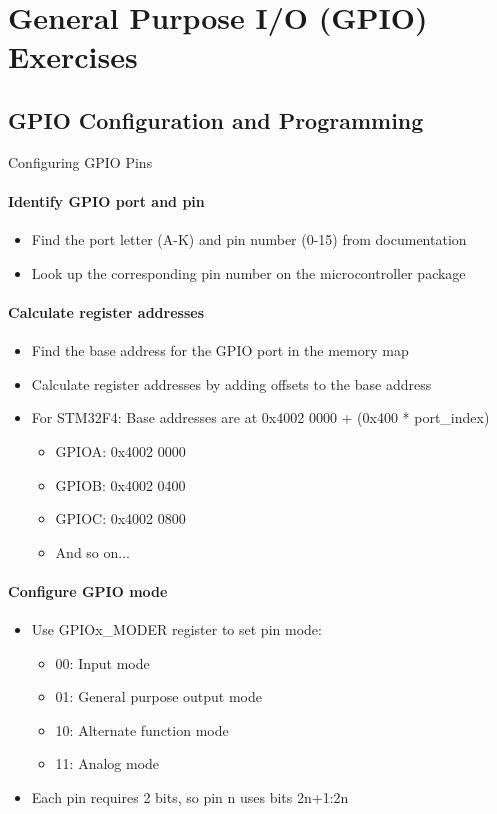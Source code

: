 \section{General Purpose I/O (GPIO) Exercises}

\subsection{GPIO Configuration and Programming}

\begin{KR}{Configuring GPIO Pins}\\
\paragraph{Identify GPIO port and pin}
\begin{itemize}
    \item Find the port letter (A-K) and pin number (0-15) from documentation
    \item Look up the corresponding pin number on the microcontroller package
\end{itemize}

\paragraph{Calculate register addresses}
\begin{itemize}
    \item Find the base address for the GPIO port in the memory map
    \item Calculate register addresses by adding offsets to the base address
    \item For STM32F4: Base addresses are at 0x4002 0000 + (0x400 * port\_index)
    \begin{itemize}
        \item GPIOA: 0x4002 0000
        \item GPIOB: 0x4002 0400
        \item GPIOC: 0x4002 0800
        \item And so on...
    \end{itemize}
\end{itemize}

\paragraph{Configure GPIO mode}
\begin{itemize}
    \item Use GPIOx\_MODER register to set pin mode:
    \begin{itemize}
        \item 00: Input mode
        \item 01: General purpose output mode
        \item 10: Alternate function mode
        \item 11: Analog mode
    \end{itemize}
    \item Each pin requires 2 bits, so pin n uses bits 2n+1:2n
\end{itemize}


\end{KR}

